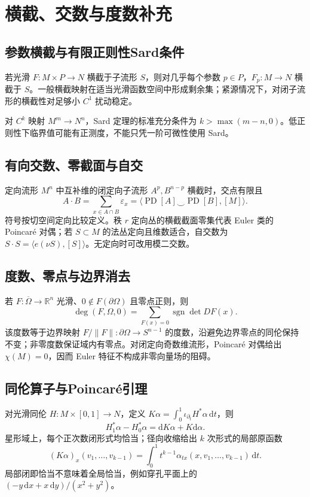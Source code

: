 \documentclass[../main.tex]{subfiles}
\begin{document}
\section{横截、交数与度数补充}
\subsection{参数横截与有限正则性Sard条件}
若光滑 $F:M\times P\to N$ 横截于子流形 $S$，则对几乎每个参数 $p\in P$，$F_p:M\to N$ 横截于 $S$。一般横截映射在适当光滑函数空间中形成剩余集；紧源情况下，对闭子流形的横截性对足够小 $C^1$ 扰动稳定。

对 $C^k$ 映射 $M^m\to N^n$，Sard 定理的标准充分条件为 $k>\max(m-n,0)$。低正则性下临界值可能有正测度，不能只凭一阶可微性使用 Sard。
\subsection{有向交数、零截面与自交}
定向流形 $M^n$ 中互补维的闭定向子流形 $A^p,B^{n-p}$ 横截时，交点有限且
\[
A\cdot B=\sum_{x\in A\cap B}\varepsilon_x
=\langle\operatorname{PD}[A]\smile\operatorname{PD}[B],[M]\rangle.
\]
符号按切空间定向比较定义。秩 $r$ 定向丛的横截截面零集代表 Euler 类的 Poincaré 对偶；若 $S\subset M$ 的法丛定向且维数适合，自交数为 $S\cdot S=\langle e(\nu S),[S]\rangle$。无定向时可改用模二交数。
\subsection{度数、零点与边界消去}
若 $F:\overline\Omega\to\mathbb R^n$ 光滑、$0\notin F(\partial\Omega)$ 且零点正则，则
\[
\deg(F,\Omega,0)=\sum_{F(x)=0}\operatorname{sgn}\det DF(x).
\]
该度数等于边界映射 $F/\|F\|:\partial\Omega\to S^{n-1}$ 的度数，沿避免边界零点的同伦保持不变；非零度数保证域内有零点。对闭定向奇数维流形，Poincaré 对偶给出 $\chi(M)=0$，因而 Euler 特征不构成非零向量场的阻碍。
\subsection{同伦算子与Poincaré引理}
对光滑同伦 $H:M\times[0,1]\to N$，定义 $K\alpha=\int_0^1\iota_{\partial_t}H^*\alpha\,\mathrm dt$，则
\[
H_1^*\alpha-H_0^*\alpha=\mathrm dK\alpha+K\mathrm d\alpha.
\]
星形域上，每个正次数闭形式均恰当；径向收缩给出 $k$ 次形式的局部原函数
\[
(K\alpha)_x(v_1,\ldots,v_{k-1})
=\int_0^1t^{k-1}\alpha_{tx}(x,v_1,\ldots,v_{k-1})\,\mathrm dt.
\]
局部闭即恰当不意味着全局恰当，例如穿孔平面上的 $(-y\,\mathrm dx+x\,\mathrm dy)/(x^2+y^2)$。
\end{document}
